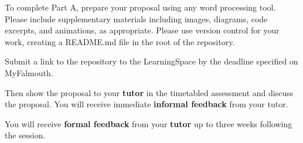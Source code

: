 \documentclass{../../fal_assignment}
\begin{document}
To complete Part A, prepare your proposal using any word processing tool. Please include supplementary materials including images, diagrams, code excerpts, and animations, as appropriate. Please use version control for your work, creating a README.md file in the root of the repository.

Submit a link to the repository to the LearningSpace by the deadline specified on MyFalmouth.

Then show the proposal to your \textbf{tutor} in the timetabled assessment and discuss the proposal. You will receive immediate \textbf{informal feedback} from your tutor.

You will receive \textbf{formal feedback} from your \textbf{tutor} up to three weeks following the session.



\end{document}

